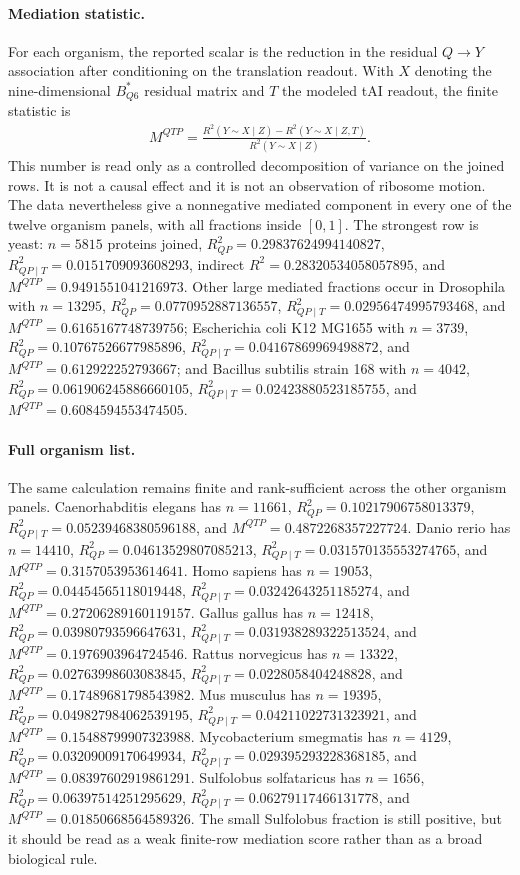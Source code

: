 \paragraph{Mediation statistic.}
For each organism, the reported scalar is the reduction in the residual $Q\to Y$ association after conditioning on the translation readout. With $X$ denoting the nine-dimensional $B^*_{Q6}$ residual matrix and $T$ the modeled tAI readout, the finite statistic is
$$
\begin{aligned}
M^{QTP}=\frac{R^2(Y\sim X\mid Z)-R^2(Y\sim X\mid Z,T)}{R^2(Y\sim X\mid Z)}.
\end{aligned}
$$
This number is read only as a controlled decomposition of variance on the joined rows. It is not a causal effect and it is not an observation of ribosome motion. The data nevertheless give a nonnegative mediated component in every one of the twelve organism panels, with all fractions inside $[0,1]$. The strongest row is yeast: $n=5815$ proteins joined, $R^2_{QP}=0.29837624994140827$, $R^2_{QP\mid T}=0.0151709093608293$, indirect $R^2=0.28320534058057895$, and $M^{QTP}=0.9491551041216973$. Other large mediated fractions occur in Drosophila with $n=13295$, $R^2_{QP}=0.0770952887136557$, $R^2_{QP\mid T}=0.02956474995793468$, and $M^{QTP}=0.6165167748739756$; Escherichia coli K12 MG1655 with $n=3739$, $R^2_{QP}=0.10767526677985896$, $R^2_{QP\mid T}=0.04167869969498872$, and $M^{QTP}=0.612922252793667$; and Bacillus subtilis strain 168 with $n=4042$, $R^2_{QP}=0.061906245886660105$, $R^2_{QP\mid T}=0.02423880523185755$, and $M^{QTP}=0.6084594553474505$.

\paragraph{Full organism list.}
The same calculation remains finite and rank-sufficient across the other organism panels. Caenorhabditis elegans has $n=11661$, $R^2_{QP}=0.10217906758013379$, $R^2_{QP\mid T}=0.05239468380596188$, and $M^{QTP}=0.4872268357227724$. Danio rerio has $n=14410$, $R^2_{QP}=0.04613529807085213$, $R^2_{QP\mid T}=0.031570135553274765$, and $M^{QTP}=0.3157053953614641$. Homo sapiens has $n=19053$, $R^2_{QP}=0.04454565118019448$, $R^2_{QP\mid T}=0.03242643251185274$, and $M^{QTP}=0.27206289160119157$. Gallus gallus has $n=12418$, $R^2_{QP}=0.03980793596647631$, $R^2_{QP\mid T}=0.031938289322513524$, and $M^{QTP}=0.1976903964724546$. Rattus norvegicus has $n=13322$, $R^2_{QP}=0.02763998603083845$, $R^2_{QP\mid T}=0.0228058404248828$, and $M^{QTP}=0.17489681798543982$. Mus musculus has $n=19395$, $R^2_{QP}=0.049827984062539195$, $R^2_{QP\mid T}=0.04211022731323921$, and $M^{QTP}=0.15488799907323988$. Mycobacterium smegmatis has $n=4129$, $R^2_{QP}=0.03209009170649934$, $R^2_{QP\mid T}=0.029395293228368185$, and $M^{QTP}=0.08397602919861291$. Sulfolobus solfataricus has $n=1656$, $R^2_{QP}=0.06397514251295629$, $R^2_{QP\mid T}=0.06279117466131778$, and $M^{QTP}=0.01850668564589326$. The small Sulfolobus fraction is still positive, but it should be read as a weak finite-row mediation score rather than as a broad biological rule.

